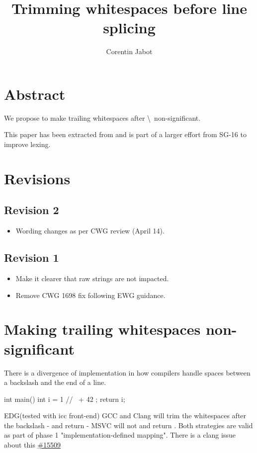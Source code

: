 \documentclass{wg21}
\title{Trimming whitespaces before line splicing}
\author{Corentin Jabot}{corentin.jabot@gmail.com}
\begin{document}
\maketitle

\paperquote{}

\section{Abstract}

We propose to make trailing whitespaces after \textbackslash \ non-significant.

This paper has been extracted from  and is part of a larger effort from SG-16 to improve lexing.

\section{Revisions}

\subsection*{Revision 2}
\begin{itemize}
    \item Wording changes as per CWG review (April 14).
\end{itemize}

\subsection*{Revision 1}
\begin{itemize}
    \item Make it clearer that raw strings are not impacted. 
    \item Remove CWG 1698 fix following EWG guidance.
\end{itemize}

\section{Making trailing whitespaces non-significant}

There is a divergence of implementation in how compilers handle spaces between a backslash and the end of a line. 

\begin{colorblock}
int main() {
    int i = 1
    //  \
    + 42
    ;
    return i;
}
\end{colorblock}

EDG(tested with icc front-end) GCC and Clang will trim the whitespaces after the backslash - and return  - MSVC will not and return .
Both strategies are valid as part of phase 1 "implementation-defined mapping".
There is a clang issue about this \href{https://bugs.llvm.org/show_bug.cgi?id=15509}{\#15509}
\end{document}

